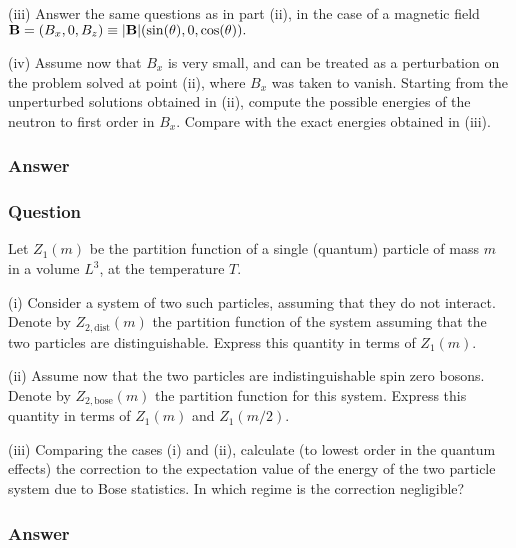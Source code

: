 (iii) Answer the same questions as in part (ii), in the case of a magnetic field $\mathbf{B} = (B_x, 0, B_z) \equiv \abs{\mathbf{B}} (\sin(\theta), 0, \cos(\theta)).$

(iv) Assume now that $B_x$ is very small, and can be treated as a perturbation on the problem solved at point (ii), where $B_x$ was taken to vanish. Starting from the unperturbed solutions obtained in (ii), compute the possible energies of the neutron to first order in $B_x$. Compare with the exact energies obtained in (iii).

\subsubsection{Answer}



\subsubsection{Question}
Let $Z_1(m)$ be the partition function of a single (quantum) particle of mass $m$ in a volume $L^3$, at the temperature $T$.

(i) Consider a system of two such particles, assuming that they do not interact. Denote by $Z_{2,\text{dist}}(m)$ the partition function of the system assuming that the two particles are distinguishable. Express this quantity in terms of $Z_1(m)$.

(ii) Assume now that the two particles are indistinguishable spin zero bosons. Denote by $Z_{2,\text{bose}}(m)$ the partition function for this system. Express this quantity in terms of $Z_1(m)$ and $Z_1(m/2)$.

(iii) Comparing the cases (i) and (ii), calculate (to lowest order in the quantum effects) the correction to the expectation value of the energy of the two particle system due to Bose statistics. In which regime is the correction negligible?

\subsubsection{Answer}



